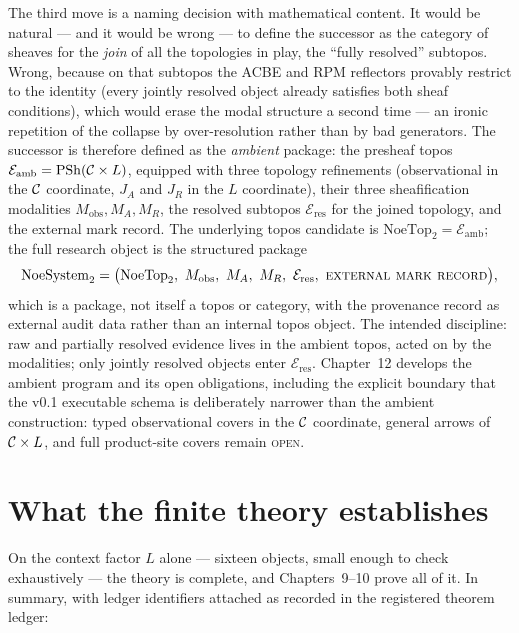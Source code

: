 The third move is a naming decision with mathematical content. It would be
natural --- and it would be wrong --- to define the successor as the
category of sheaves for the \emph{join} of all the topologies in play, the
``fully resolved'' subtopos. Wrong, because on that subtopos the ACBE and
RPM reflectors provably restrict to the identity (every jointly resolved
object already satisfies both sheaf conditions), which would erase the modal
structure a second time --- an ironic repetition of the collapse by
over-resolution rather than by bad generators. The successor is therefore
defined as the \emph{ambient} package: the presheaf topos
$\mathcal{E}_{\mathrm{amb}} = \mathrm{PSh}(\mathcal{C} \times L)$, equipped with three
topology refinements (observational in the $\mathcal{C}$ coordinate, $J_A$ and $J_R$
in the $L$ coordinate), their three sheafification modalities
$M_{\mathrm{obs}}, M_A, M_R$, the resolved subtopos
$\mathcal{E}_{\mathrm{res}}$ for the joined topology, and the external mark
record. The underlying topos candidate is
$\mathrm{NoeTop}_2 = \mathcal{E}_{\mathrm{amb}}$; the full research object
is the structured package
\[
\mathrm{NoeSystem}_2 = \bigl(\mathrm{NoeTop}_2,\ M_{\mathrm{obs}},\ M_A,\
M_R,\ \mathcal{E}_{\mathrm{res}},\ \textsc{external mark record}\bigr),
\]
which is a package, not itself a topos or category, with the provenance
record as external audit data rather than an internal topos object. The
intended discipline: raw and partially resolved evidence lives in the
ambient topos, acted on by the modalities; only jointly resolved objects
enter $\mathcal{E}_{\mathrm{res}}$. Chapter~12 develops the ambient program
and its open obligations, including the explicit boundary that the v0.1
executable schema is deliberately narrower than the ambient construction:
typed observational covers in the $\mathcal{C}$ coordinate, general arrows of
$\mathcal{C} \times L$, and full product-site covers remain \textsc{open}.

\section{What the finite theory establishes}\label{ch01:sec:results}

On the context factor $L$ alone --- sixteen objects, small enough to check
exhaustively --- the theory is complete, and Chapters~9--10 prove all of
it. In summary, with ledger identifiers attached as recorded in the
registered theorem ledger:

